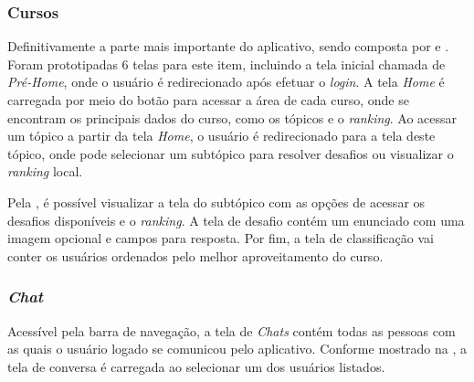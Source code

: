 
\subsubsection{Cursos}

Definitivamente a parte mais importante do aplicativo, sendo composta por  e . Foram prototipadas 6 telas para este item, incluindo a tela inicial chamada de \textit{Pré-Home}, onde o usuário é redirecionado após efetuar o \textit{login}. A tela \textit{Home} é carregada por meio do botão para acessar a área de cada curso, onde se encontram os principais dados do curso, como os tópicos e o \textit{ranking}. Ao acessar um tópico a partir da tela \textit{Home}, o usuário é redirecionado para a tela deste tópico, onde pode selecionar um subtópico para resolver desafios ou visualizar o \textit{ranking} local.


Pela , é possível visualizar a tela do subtópico com as opções de acessar os desafios disponíveis e o \textit{ranking}. A tela de desafio contém um enunciado com uma imagem opcional e campos para resposta. Por fim, a tela de classificação vai conter os usuários ordenados pelo melhor aproveitamento do curso.


\subsubsection{\textit{Chat}}

Acessível pela barra de navegação, a tela de \textit{Chats} contém todas as pessoas com as quais o usuário logado se comunicou pelo aplicativo. Conforme mostrado na , a tela de conversa é carregada ao selecionar um dos usuários listados.


